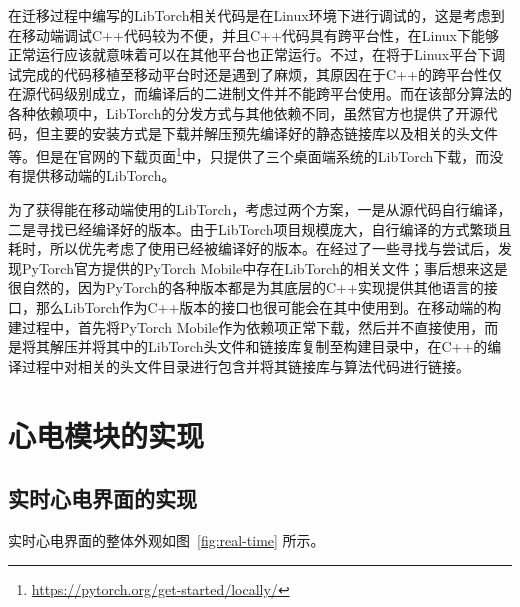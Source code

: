 在迁移过程中编写的LibTorch相关代码是在Linux环境下进行调试的，这是考虑到在移动端调试C++代码较为不便，并且C++代码具有跨平台性，在Linux下能够正常运行应该就意味着可以在其他平台也正常运行。不过，在将于Linux平台下调试完成的代码移植至移动平台时还是遇到了麻烦，其原因在于C++的跨平台性仅在源代码级别成立，而编译后的二进制文件并不能跨平台使用。而在该部分算法的各种依赖项中，LibTorch的分发方式与其他依赖不同，虽然官方也提供了开源代码，但主要的安装方式是下载并解压预先编译好的静态链接库以及相关的头文件等。但是在官网的下载页面\footnote{\url{https://pytorch.org/get-started/locally/}}中，只提供了三个桌面端系统的LibTorch下载，而没有提供移动端的LibTorch。

为了获得能在移动端使用的LibTorch，考虑过两个方案，一是从源代码自行编译，二是寻找已经编译好的版本。由于LibTorch项目规模庞大，自行编译的方式繁琐且耗时，所以优先考虑了使用已经被编译好的版本。在经过了一些寻找与尝试后，发现PyTorch官方提供的PyTorch Mobile中存在LibTorch的相关文件；事后想来这是很自然的，因为PyTorch的各种版本都是为其底层的C++实现提供其他语言的接口，那么LibTorch作为C++版本的接口也很可能会在其中使用到。在移动端的构建过程中，首先将PyTorch Mobile作为依赖项正常下载，然后并不直接使用，而是将其解压并将其中的LibTorch头文件和链接库复制至构建目录中，在C++的编译过程中对相关的头文件目录进行包含并将其链接库与算法代码进行链接。


\section{心电模块的实现}\label{sec:ecg}

\subsection{实时心电界面的实现}\label{subsec:real-time-ui}

实时心电界面的整体外观如图~\ref{fig:real-time} 所示。

